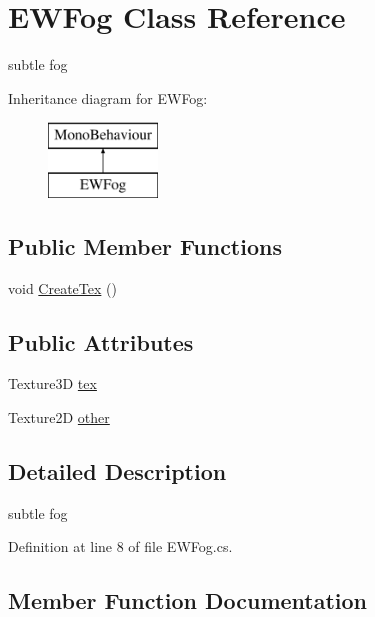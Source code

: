 \hypertarget{class_e_w_fog}{}\section{E\+W\+Fog Class Reference}
\label{class_e_w_fog}


subtle fog  


Inheritance diagram for E\+W\+Fog\+:\begin{figure}[H]
\begin{center}
\leavevmode
\includegraphics[height=2.000000cm]{class_e_w_fog}
\end{center}
\end{figure}
\subsection*{Public Member Functions}
\begin{DoxyCompactItemize}
\item 
void \mbox{\hyperlink{class_e_w_fog_a7d1fb66f00eaad1e01148b86978ae2b4}{Create\+Tex}} ()
\end{DoxyCompactItemize}
\subsection*{Public Attributes}
\begin{DoxyCompactItemize}
\item 
Texture3D \mbox{\hyperlink{class_e_w_fog_a3465804803a9ad317a94d35158b65aff}{tex}}
\item 
Texture2D \mbox{\hyperlink{class_e_w_fog_ada6e4e6a7b5060f00ca4c3ef3d87f484}{other}}
\end{DoxyCompactItemize}


\subsection{Detailed Description}
subtle fog 



Definition at line 8 of file E\+W\+Fog.\+cs.



\subsection{Member Function Documentation}
\mbox{\label{class_e_w_fog_a7d1fb66f00eaad1e01148b86978ae2b4}} 
